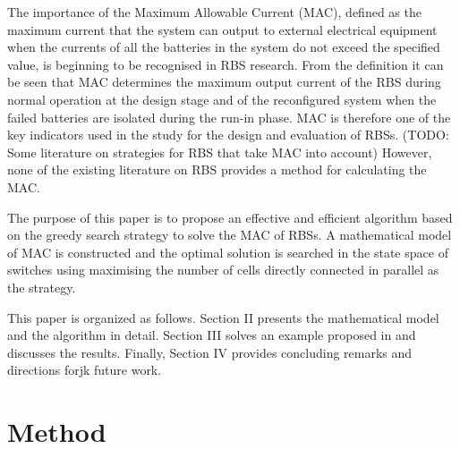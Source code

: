 \documentclass{article}
\begin{document}
The importance of the Maximum Allowable Current (MAC), defined as the maximum current that the system can output to external electrical equipment when the currents of all the batteries in the system do not exceed the specified value, is beginning to be recognised in RBS research. 
From the definition it can be seen that MAC determines the maximum output current of the RBS during normal operation at the design stage and of the reconfigured system when the failed batteries are isolated during the run-in phase. 
MAC is therefore one of the key indicators used in the study for the design and evaluation of RBSs.
(TODO: Some literature on strategies for RBS that take MAC into account)
However, none of the existing literature on RBS provides a method for calculating the MAC.


The purpose of this paper is to propose an effective and efficient algorithm based on the greedy search strategy to solve the MAC of RBSs. 
A mathematical model of MAC is constructed and the optimal solution is searched in the state space of switches using maximising the number of cells directly connected in parallel as the strategy.


This paper is organized as follows. 
Section II presents the mathematical model and the algorithm in detail.
Section III solves an example proposed in \cite{kimDESADependableEfficient2012}and discusses the results. 
Finally, Section IV provides concluding remarks and directions forjk future work.

\section{Method}
\end{document}
